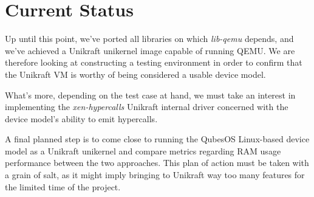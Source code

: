 \chapter{Current Status}
\label{chapter:current-status}

Up until this point, we've ported all libraries on which \textit{lib-qemu} depends, and we've achieved a Unikraft unikernel image capable of running QEMU.
We are therefore looking at constructing a testing environment in order to confirm that the Unikraft VM is worthy of being considered a usable device model.

What's more, depending on the test case at hand, we must take an interest in implementing the \textit{xen-hypercalls} Unikraft internal driver concerned with the device model's ability to emit hypercalls.

A final planned step is to come close to running the QubesOS Linux-based device model as a Unikraft unikernel and compare metrics regarding RAM usage performance between the two approaches.
This plan of action must be taken with a grain of salt, as it might imply bringing to Unikraft way too many features for the limited time of the project.
